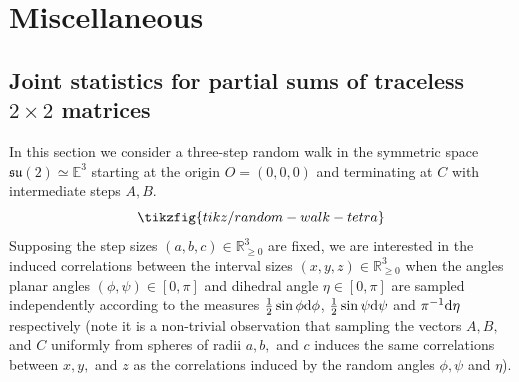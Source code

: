\documentclass[notitlepage, 10pt]{article}
\begin{document}
\section{Miscellaneous}

\subsection{Joint statistics for partial sums of traceless \texorpdfstring{$2\times 2$}{2 by 2} matrices}

In this section we consider a three-step random walk in the symmetric space $\mathfrak{su}(2) \simeq \mathbb E^{3}$ starting at the origin $O = (0,0,0)$ and terminating at $C$ with intermediate steps $A,B$.
\begin{equation}
    \tikzfig{tikz/random-walk-tetra}
\end{equation}
Supposing the step sizes $(a,b,c) \in \mathbb R_{\geq 0}^{3}$ are fixed, we are interested in the induced correlations between the interval sizes $(x,y,z) \in \mathbb R_{\geq 0}^{3}$ when the angles planar angles $(\phi, \psi) \in [0,\pi]$ and dihedral angle $\eta \in [0,\pi]$ are sampled independently according to the measures $\frac{1}{2}\sin \phi \mathrm{d} \phi$, $\frac{1}{2}\sin \psi \mathrm{d} \psi$ and $\pi^{-1}\mathrm{d} \eta$ respectively (note it is a non-trivial observation that sampling the vectors $A, B,$ and $C$ uniformly from spheres of radii $a,b,$ and $c$ induces the same correlations between $x,y,$ and $z$ as the correlations induced by the random angles $\phi, \psi$ and $\eta$).
\end{document}
